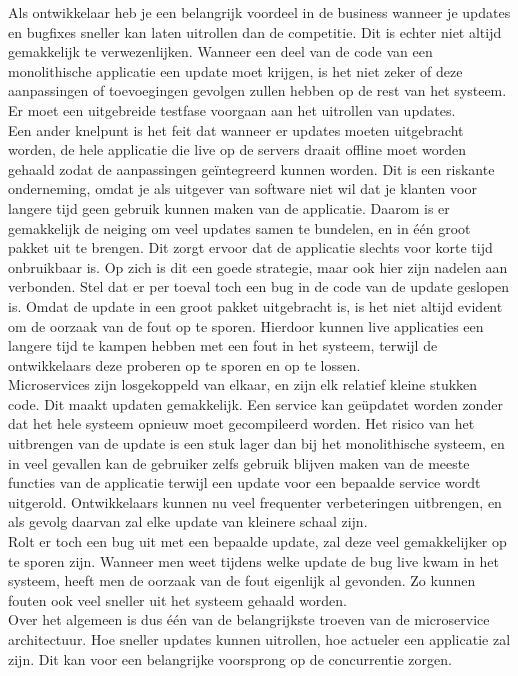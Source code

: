 \documentclass[pdftex,a4paper,12pt,twoside]{report}
\begin{document}
Als ontwikkelaar heb je een belangrijk voordeel in de business wanneer je updates en bugfixes sneller kan laten uitrollen dan de competitie. Dit is echter niet altijd gemakkelijk te verwezenlijken. Wanneer een deel van de code van een monolithische applicatie een update moet krijgen, is het niet zeker of deze aanpassingen of toevoegingen gevolgen zullen hebben op de rest van het systeem. Er moet een uitgebreide testfase voorgaan aan het uitrollen van updates.
\\
Een ander knelpunt is het feit dat wanneer er updates moeten uitgebracht worden, de hele applicatie die live op de servers draait offline moet worden gehaald zodat de aanpassingen geïntegreerd kunnen worden. Dit is een riskante onderneming, omdat je als uitgever van software niet wil dat je klanten voor langere tijd geen gebruik kunnen maken van de applicatie. Daarom is er gemakkelijk de neiging om veel updates samen te bundelen, en in één groot pakket uit te brengen. Dit zorgt ervoor dat de applicatie slechts voor korte tijd onbruikbaar is. Op zich is dit een goede strategie, maar ook hier zijn nadelen aan verbonden. Stel dat er per toeval toch een bug in de code van de update geslopen is. Omdat de update in een groot pakket uitgebracht is, is het niet altijd evident om de oorzaak van de fout op te sporen. Hierdoor kunnen live applicaties een langere tijd te kampen hebben met een fout in het systeem, terwijl de ontwikkelaars deze proberen op te sporen en op te lossen.
\\
Microservices zijn losgekoppeld van elkaar, en zijn elk relatief kleine stukken code. Dit maakt updaten gemakkelijk. Een service kan geüpdatet worden zonder dat het hele systeem opnieuw moet gecompileerd worden. Het risico van het uitbrengen van de update is een stuk lager dan bij het monolithische systeem, en in veel gevallen kan de gebruiker zelfs gebruik blijven maken van de meeste functies van de applicatie terwijl een update voor een bepaalde service wordt uitgerold. Ontwikkelaars kunnen nu veel frequenter verbeteringen uitbrengen, en als gevolg daarvan zal elke update van kleinere schaal zijn.
\\
Rolt er toch een bug uit met een bepaalde update, zal deze veel gemakkelijker op te sporen zijn. Wanneer men weet tijdens welke update de bug live kwam in het systeem, heeft men de oorzaak van de fout eigenlijk al gevonden. Zo kunnen fouten ook veel sneller uit het systeem gehaald worden.
\\
Over het algemeen is dus één van de belangrijkste troeven van de microservice architectuur. Hoe sneller updates kunnen uitrollen, hoe actueler een applicatie zal zijn. Dit kan voor een belangrijke voorsprong op de concurrentie zorgen.
\end{document}
